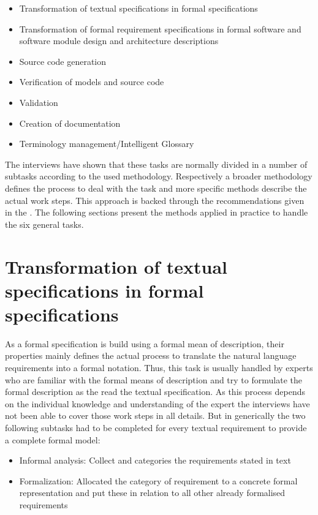 \documentclass{./template/openetcs_report}
\begin{document}
\vspace{-10pt}
\begin{itemize}[topsep=2pt, partopsep=2pt,itemsep=2pt,parsep=2pt]
\item Transformation of textual specifications in formal specifications
\item Transformation of formal requirement specifications in formal software and software module design and architecture descriptions
\item Source code generation
\item Verification of models and source code
\item Validation
\item Creation of documentation
\item Terminology management/Intelligent Glossary
\end{itemize}

The interviews have shown that these tasks are normally divided in a number of subtasks according to the used methodology. Respectively a broader methodology defines the  process to deal with the task and more specific methods describe the actual work steps. This approach is backed through the recommendations given in the \citeauthor{EN50128:2011}. The following sections present the methods applied in practice to handle the six general tasks.

\section{Transformation of textual specifications in formal specifications}

As a formal specification is build using a formal mean of description, their properties mainly defines the actual process to translate the natural language requirements into a formal notation. Thus, this task is usually handled by experts who are familiar with the formal means of description and try to formulate the formal description as the read the textual specification. As this process depends on the individual knowledge and understanding of the expert the interviews have not been able to cover those work steps in all details. But in generically the two following subtasks had to be completed for every textual requirement to provide a complete formal model:
\begin{itemize}
\item Informal analysis: Collect and categories the requirements stated in text
\item Formalization: Allocated the category of requirement to a concrete formal representation and put these in relation to all other already formalised requirements
\end{itemize}
\end{document}
